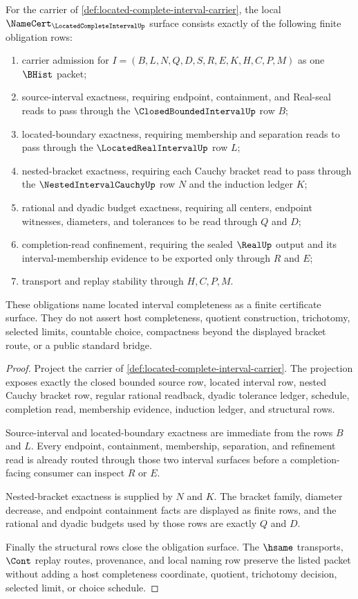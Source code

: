 \begin{theorem}
\label{thm:located-complete-interval-namecert-obligations}
For the carrier of \autoref{def:located-complete-interval-carrier}, the local $\NameCert_{\LocatedCompleteIntervalUp}$ surface consists exactly of the following finite obligation rows:
\begin{enumerate}
\item carrier admission for $I=(B,L,N,Q,D,S,R,E,K,H,C,P,M)$ as one $\BHist$ packet;
\item source-interval exactness, requiring endpoint, containment, and Real-seal reads to pass through the $\ClosedBoundedIntervalUp$ row $B$;
\item located-boundary exactness, requiring membership and separation reads to pass through the $\LocatedRealIntervalUp$ row $L$;
\item nested-bracket exactness, requiring each Cauchy bracket read to pass through the $\NestedIntervalCauchyUp$ row $N$ and the induction ledger $K$;
\item rational and dyadic budget exactness, requiring all centers, endpoint witnesses, diameters, and tolerances to be read through $Q$ and $D$;
\item completion-read confinement, requiring the sealed $\RealUp$ output and its interval-membership evidence to be exported only through $R$ and $E$;
\item transport and replay stability through $H,C,P,M$.
\end{enumerate}
These obligations name located interval completeness as a finite certificate surface. They do not assert host completeness, quotient construction, trichotomy, selected limits, countable choice, compactness beyond the displayed bracket route, or a public standard bridge.
\end{theorem}
\begin{proof}
Project the carrier of \autoref{def:located-complete-interval-carrier}. The projection exposes exactly the closed bounded source row, located interval row, nested Cauchy bracket row, regular rational readback, dyadic tolerance ledger, schedule, completion read, membership evidence, induction ledger, and structural rows.

Source-interval and located-boundary exactness are immediate from the rows $B$ and $L$. Every endpoint, containment, membership, separation, and refinement read is already routed through those two interval surfaces before a completion-facing consumer can inspect $R$ or $E$.

Nested-bracket exactness is supplied by $N$ and $K$. The bracket family, diameter decrease, and endpoint containment facts are displayed as finite rows, and the rational and dyadic budgets used by those rows are exactly $Q$ and $D$.

Finally the structural rows close the obligation surface. The $\hsame$ transports, $\Cont$ replay routes, provenance, and local naming row preserve the listed packet without adding a host completeness coordinate, quotient, trichotomy decision, selected limit, or choice schedule.
\end{proof}

